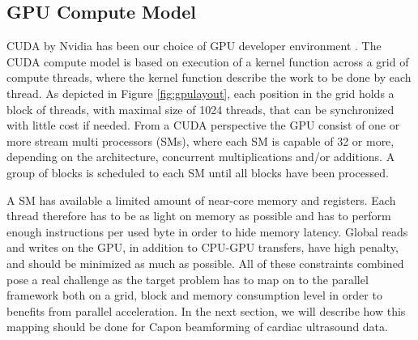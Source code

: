 \documentclass[conference]{IEEEtran}
\renewcommand{\vec}[1]{\mathbf{#1}}
\begin{document}

\subsection{GPU Compute Model}
CUDA by Nvidia has been our choice of GPU developer environment \cite{Nvidia2011}. The CUDA compute model is based on execution of a kernel function across a grid of compute threads, where the kernel function describe the work to be done by each thread. As depicted in Figure \ref{fig:gpulayout}, each position in the grid holds a block of threads, with maximal size of 1024 threads, that can be synchronized with little cost if needed. 
From a CUDA perspective the GPU consist of one or more stream multi processors (SMs), where each SM is capable of 32 or more, depending on the architecture, concurrent multiplications and/or additions. A group of blocks is scheduled to each SM until all blocks have been processed. 

A SM has available a limited amount of near-core memory and registers. Each thread therefore has to be as light on memory as possible and has to perform enough instructions per used byte in order to hide memory latency. Global reads and writes on the GPU, in addition to CPU-GPU transfers, have high penalty, and should be minimized as much as possible. All of these constraints combined pose a real challenge as the target problem has to map on to the parallel framework both on a grid, block and memory consumption level in order to benefits from parallel acceleration. In the next section, we will describe how this mapping should be done for Capon beamforming of cardiac ultrasound data.    
\end{document}
